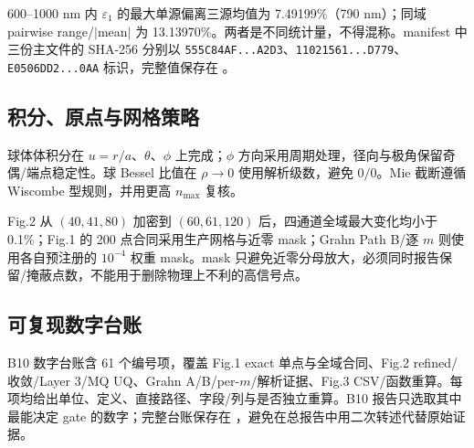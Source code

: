 600--1000 nm 内 $\varepsilon_1$ 的最大单源偏离三源均值为 7.49199\%（790 nm）；同域 pairwise range/$|$mean$|$ 为 13.13970\%。两者是不同统计量，不得混称。manifest 中三份主文件的 SHA-256 分别以 \texttt{555C84AF...A2D3}、\texttt{11021561...D779}、\texttt{E0506DD2...0AA} 标识，完整值保存在 。

\subsection{积分、原点与网格策略}

球体体积分在 $u=r/a$、$\theta$、$\phi$ 上完成；$\phi$ 方向采用周期处理，径向与极角保留奇偶/端点稳定性。球 Bessel 比值在 $\rho\to0$ 使用解析级数，避免 $0/0$。Mie 截断遵循 Wiscombe 型规则\cite{Wiscombe1980}，并用更高 $n_{\max}$ 复核。

Fig.2 从 $(40,41,80)$ 加密到 $(60,61,120)$ 后，四通道全域最大变化均小于 0.1\%；Fig.1 的 200 点合同采用生产网格与近零 mask；Grahn Path B/逐 $m$ 则使用各自预注册的 $10^{-4}$ 权重 mask。mask 只避免近零分母放大，必须同时报告保留/掩蔽点数，不能用于删除物理上不利的高信号点。

\subsection{可复现数字台账}

B10 数字台账含 61 个编号项，覆盖 Fig.1 exact 单点与全域合同、Fig.2 refined/收敛/Layer 3/MQ UQ、Grahn A/B/per-$m$/解析证据、Fig.3 CSV/函数重算。每项均给出单位、定义、直接路径、字段/列与是否独立重算。B10 报告只选取其中最能决定 gate 的数字；完整台账保存在 ，避免在总报告中用二次转述代替原始证据。
